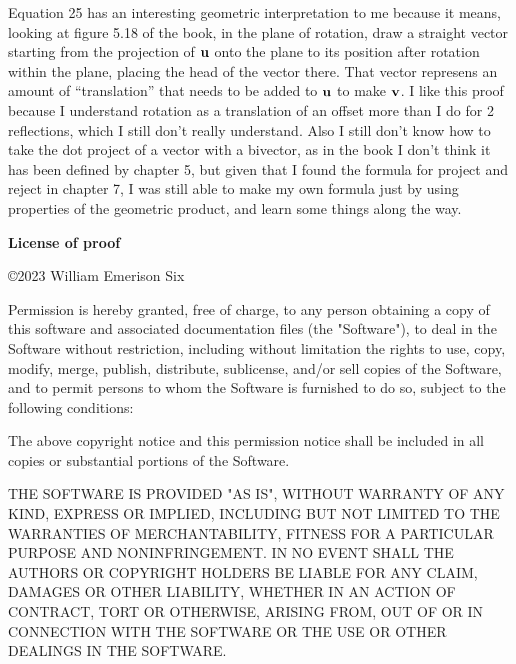 \documentclass[12pt]{article}
\begin{document}
Equation 25 has an interesting geometric interpretation to me because it means, looking at figure 5.18
of the book, in the plane of rotation, draw a straight vector starting from the projection of $\vb{u}$ onto the plane
to its position after rotation within the plane, placing the head of the vector there.  That vector
represens an amount of ``translation'' that needs to be added to $\vb{u}$ to make $\vb{v}$.  I like
this proof because I understand rotation as a translation of an offset more than I do for 2 reflections, which
I still don't really understand. Also I still don't know how to take the dot project of a vector with a bivector,
as in the book I don't think it has been defined by chapter 5,
but given that I found the formula for project and reject in chapter 7, I was still able to make my own
formula just by using properties of the geometric product, and learn some things along the way.

\newpage

\textbf{License of proof }

\copyright 2023 William Emerison Six

Permission is hereby granted, free of charge, to any person obtaining a copy of this software and associated documentation files (the "Software"), to deal in the Software without restriction, including without limitation the rights to use, copy, modify, merge, publish, distribute, sublicense, and/or sell copies of the Software, and to permit persons to whom the Software is furnished to do so, subject to the following conditions:

The above copyright notice and this permission notice shall be included in all copies or substantial portions of the Software.

THE SOFTWARE IS PROVIDED "AS IS", WITHOUT WARRANTY OF ANY KIND, EXPRESS OR IMPLIED, INCLUDING BUT NOT LIMITED TO THE WARRANTIES OF MERCHANTABILITY, FITNESS FOR A PARTICULAR PURPOSE AND NONINFRINGEMENT. IN NO EVENT SHALL THE AUTHORS OR COPYRIGHT HOLDERS BE LIABLE FOR ANY CLAIM, DAMAGES OR OTHER LIABILITY, WHETHER IN AN ACTION OF CONTRACT, TORT OR OTHERWISE, ARISING FROM, OUT OF OR IN CONNECTION WITH THE SOFTWARE OR THE USE OR OTHER DEALINGS IN THE SOFTWARE.
\end{document}
